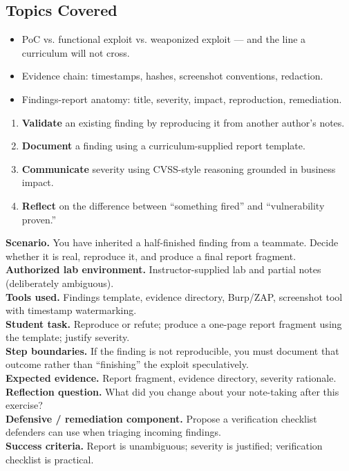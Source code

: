 \documentclass[11pt,letterpaper,oneside]{report}
\begin{document}
\subsection*{Topics Covered}
\begin{itemize}
  \item PoC vs. functional exploit vs. weaponized exploit --- and the line a curriculum will not cross.
  \item Evidence chain: timestamps, hashes, screenshot conventions, redaction.
  \item Findings-report anatomy: title, severity, impact, reproduction, remediation.
\end{itemize}

\begin{outcomes}
\begin{enumerate}
  \item \textbf{Validate} an existing finding by reproducing it from another author's notes.
  \item \textbf{Document} a finding using a curriculum-supplied report template.
  \item \textbf{Communicate} severity using CVSS-style reasoning grounded in business impact.
  \item \textbf{Reflect} on the difference between ``something fired'' and ``vulnerability proven.''
\end{enumerate}
\end{outcomes}

\begin{labbox}
\textbf{Scenario.} You have inherited a half-finished finding from a teammate. Decide whether it is real, reproduce it, and produce a final report fragment.\\[3pt]
\textbf{Authorized lab environment.} Instructor-supplied lab and partial notes (deliberately ambiguous).\\[3pt]
\textbf{Tools used.} Findings template, evidence directory, Burp/ZAP, screenshot tool with timestamp watermarking.\\[3pt]
\textbf{Student task.} Reproduce or refute; produce a one-page report fragment using the template; justify severity.\\[3pt]
\textbf{Step boundaries.} If the finding is not reproducible, you must document that outcome rather than ``finishing'' the exploit speculatively.\\[3pt]
\textbf{Expected evidence.} Report fragment, evidence directory, severity rationale.\\[3pt]
\textbf{Reflection question.} What did you change about your note-taking after this exercise?\\[3pt]
\textbf{Defensive / remediation component.} Propose a verification checklist defenders can use when triaging incoming findings.\\[3pt]
\textbf{Success criteria.} Report is unambiguous; severity is justified; verification checklist is practical.
\end{labbox}
\end{document}
